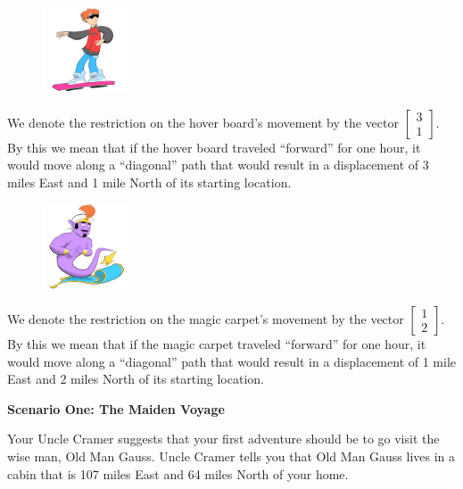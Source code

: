 \documentclass[14pt]{problemset}
\newcommand{\mat}[1]{\begin{bmatrix}#1\end{bmatrix}}
\begin{document}
\begin{minipage}{\textwidth}
	\vspace{.5cm}
	\begin{figure}
	\vspace{-.8cm}
	\includegraphics[width=1in]{images/HoverBoard-small.png}
	\end{figure}

	We denote the restriction on the hover board's movement by the vector
	$\mat{3 \\1}$. By this we mean that if
	the hover board traveled ``forward'' for one hour, it would move along a
	``diagonal'' path that would result in a displacement of 3 miles East and
	1 mile North of its starting location.
\end{minipage}

\begin{minipage}{\textwidth}
	\vspace{.5cm}
	\begin{figure}
	\vspace{-.8cm}
	\includegraphics[width=1in]{images/MagicCarpet-small.png}
	\end{figure}

	We denote the restriction on the magic carpet's movement by the vector
	$\mat{1 \\2 }$. By this we mean that if the
	magic carpet traveled ``forward'' for one hour, it would move along a
	``diagonal'' path that would result in a displacement of 1 mile East and
	2 miles North of its starting location.
\end{minipage}


\vspace{10mm}

\textbf{Scenario One: The Maiden Voyage}

Your Uncle Cramer suggests that your first adventure should be to go visit
the wise man, Old Man Gauss. Uncle Cramer tells you that Old Man Gauss
lives in a cabin that is 107 miles East and 64 miles North of your home.
\end{document}
